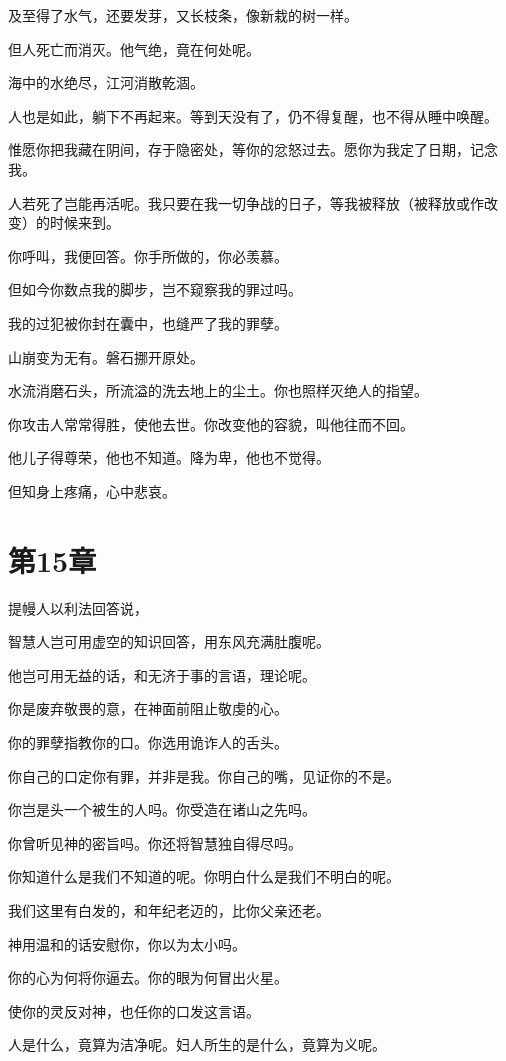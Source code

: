\documentclass[12pt,oneside]{book}
\begin{document}
及至得了水气，还要发芽，又长枝条，像新栽的树一样。

但人死亡而消灭。他气绝，竟在何处呢。

海中的水绝尽，江河消散乾涸。

人也是如此，躺下不再起来。等到天没有了，仍不得复醒，也不得从睡中唤醒。

惟愿你把我藏在阴间，存于隐密处，等你的忿怒过去。愿你为我定了日期，记念我。

人若死了岂能再活呢。我只要在我一切争战的日子，等我被释放（被释放或作改变）的时候来到。

你呼叫，我便回答。你手所做的，你必羡慕。

但如今你数点我的脚步，岂不窥察我的罪过吗。

我的过犯被你封在囊中，也缝严了我的罪孽。

山崩变为无有。磐石挪开原处。

水流消磨石头，所流溢的洗去地上的尘土。你也照样灭绝人的指望。

你攻击人常常得胜，使他去世。你改变他的容貌，叫他往而不回。

他儿子得尊荣，他也不知道。降为卑，他也不觉得。

但知身上疼痛，心中悲哀。


\chapter{第15章}
提幔人以利法回答说，

智慧人岂可用虚空的知识回答，用东风充满肚腹呢。

他岂可用无益的话，和无济于事的言语，理论呢。

你是废弃敬畏的意，在神面前阻止敬虔的心。

你的罪孽指教你的口。你选用诡诈人的舌头。

你自己的口定你有罪，并非是我。你自己的嘴，见证你的不是。

你岂是头一个被生的人吗。你受造在诸山之先吗。

你曾听见神的密旨吗。你还将智慧独自得尽吗。

你知道什么是我们不知道的呢。你明白什么是我们不明白的呢。

我们这里有白发的，和年纪老迈的，比你父亲还老。

神用温和的话安慰你，你以为太小吗。

你的心为何将你逼去。你的眼为何冒出火星。

使你的灵反对神，也任你的口发这言语。

人是什么，竟算为洁净呢。妇人所生的是什么，竟算为义呢。
\end{document}
